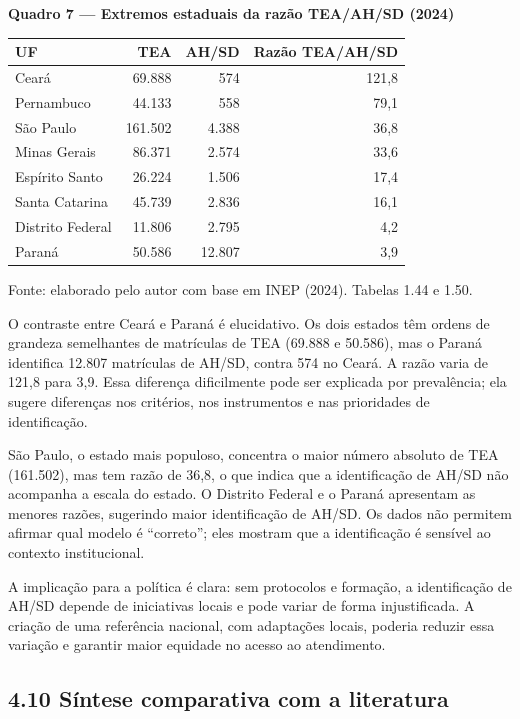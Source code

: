 \textbf{Quadro 7 --- Extremos estaduais da razão TEA/AH/SD (2024)}

\begingroup\small

\begin{longtable}[]{@{}lrrr@{}}
\toprule\noalign{}
UF & TEA & AH/SD & Razão TEA/AH/SD \\
\midrule\noalign{}
\endhead
\bottomrule\noalign{}
\endlastfoot
Ceará & 69.888 & 574 & 121,8 \\
Pernambuco & 44.133 & 558 & 79,1 \\
São Paulo & 161.502 & 4.388 & 36,8 \\
Minas Gerais & 86.371 & 2.574 & 33,6 \\
Espírito Santo & 26.224 & 1.506 & 17,4 \\
Santa Catarina & 45.739 & 2.836 & 16,1 \\
Distrito Federal & 11.806 & 2.795 & 4,2 \\
Paraná & 50.586 & 12.807 & 3,9 \\
\end{longtable}

\endgroup

Fonte: elaborado pelo autor com base em INEP (2024). Tabelas 1.44 e
1.50.

O contraste entre Ceará e Paraná é elucidativo. Os dois estados têm
ordens de grandeza semelhantes de matrículas de TEA (69.888 e 50.586),
mas o Paraná identifica 12.807 matrículas de AH/SD, contra 574 no Ceará.
A razão varia de 121,8 para 3,9. Essa diferença dificilmente pode ser
explicada por prevalência; ela sugere diferenças nos critérios, nos
instrumentos e nas prioridades de identificação.

São Paulo, o estado mais populoso, concentra o maior número absoluto de
TEA (161.502), mas tem razão de 36,8, o que indica que a identificação
de AH/SD não acompanha a escala do estado. O Distrito Federal e o Paraná
apresentam as menores razões, sugerindo maior identificação de AH/SD. Os
dados não permitem afirmar qual modelo é ``correto''; eles mostram que a
identificação é sensível ao contexto institucional.

A implicação para a política é clara: sem protocolos e formação, a
identificação de AH/SD depende de iniciativas locais e pode variar de
forma injustificada. A criação de uma referência nacional, com
adaptações locais, poderia reduzir essa variação e garantir maior
equidade no acesso ao atendimento.

\subsection{4.10 Síntese comparativa com a
literatura}\label{suxedntese-comparativa-com-a-literatura}

